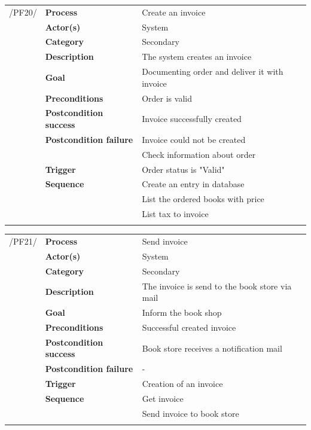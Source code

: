 \documentclass[11pt,a4paper,oneside,svgnames]{report}
\begin{document}
\noindent
\begin{tabular}{p{1.5cm}p{3cm}p{8cm}}
\cellcolor{white}/PF20/	& \textbf{Process} & Create an invoice\\
\cellcolor{white}		& \textbf{Actor(s)} & System\\
\cellcolor{white}		& \textbf{Category} & Secondary\\
\cellcolor{white}		& \textbf{Description}	 & The system creates an invoice \\
\cellcolor{white}		& \textbf{Goal} & Documenting order and deliver it with invoice\\
\cellcolor{white}		& \textbf{Preconditions} & Order is valid\\
\cellcolor{white}		& \textbf{Postcondition success} & Invoice successfully created\\
\cellcolor{white}		& \textbf{Postcondition failure} & Invoice could not be created\\
\cellcolor{white}		& & Check information about order\\
\cellcolor{white}		& \textbf{Trigger} & Order status is "Valid"\\
\cellcolor{white}		& \textbf{Sequence} & Create an entry in database\\
\cellcolor{white}		& & List the ordered books with price\\
\cellcolor{white}		& & List tax to invoice\\
\cellcolor{white}\hfill \\
\end{tabular}

\noindent
\begin{tabular}{p{1.5cm}p{3cm}p{8cm}}
\cellcolor{white}/PF21/	& \textbf{Process} & Send invoice\\
\cellcolor{white}		& \textbf{Actor(s)} & System\\
\cellcolor{white}		& \textbf{Category} & Secondary\\
\cellcolor{white}		& \textbf{Description}	 & The invoice is send to the book store via mail\\
\cellcolor{white}		& \textbf{Goal} & Inform the book shop\\
\cellcolor{white}		& \textbf{Preconditions} & Successful created invoice\\
\cellcolor{white}		& \textbf{Postcondition success} & Book store receives a notification mail\\
\cellcolor{white}		& \textbf{Postcondition failure} & -\\
\cellcolor{white}		& \textbf{Trigger} & Creation of an invoice\\
\cellcolor{white}		& \textbf{Sequence} & Get invoice\\
\cellcolor{white}		& & Send invoice to book store\\
\cellcolor{white}\hfill \\
\end{tabular}
\end{document}
